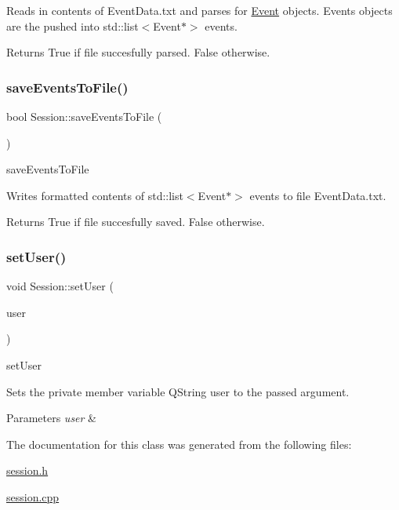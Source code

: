 Reads in contents of Event\+Data.\+txt and parses for \hyperlink{class_event}{Event} objects. Events objects are the pushed into std\+::list$<$\+Event$\ast$$>$ events. \begin{DoxyReturn}{Returns}
True if file succesfully parsed. False otherwise. 
\end{DoxyReturn}
\mbox{\label{class_session_af095af8449dd10f6fdf3db6d530e109e}} 
\subsubsection{\texorpdfstring{save\+Events\+To\+File()}{saveEventsToFile()}}
{\footnotesize\ttfamily bool Session\+::save\+Events\+To\+File (\begin{DoxyParamCaption}{ }\end{DoxyParamCaption})}



save\+Events\+To\+File 

Writes formatted contents of std\+::list$<$\+Event$\ast$$>$ events to file Event\+Data.\+txt. \begin{DoxyReturn}{Returns}
True if file succesfully saved. False otherwise. 
\end{DoxyReturn}
\mbox{\label{class_session_a3e4500bdcf80458ae14dde3eb413adb8}} 
\subsubsection{\texorpdfstring{set\+User()}{setUser()}}
{\footnotesize\ttfamily void Session\+::set\+User (\begin{DoxyParamCaption}\item[{Q\+String}]{user }\end{DoxyParamCaption})}



set\+User 

Sets the private member variable Q\+String user to the passed argument. 
\begin{DoxyParams}{Parameters}
{\em user} & \\
\hline
\end{DoxyParams}


The documentation for this class was generated from the following files\+:\begin{DoxyCompactItemize}
\item 
\hyperlink{session_8h}{session.\+h}\item 
\hyperlink{session_8cpp}{session.\+cpp}\end{DoxyCompactItemize}

